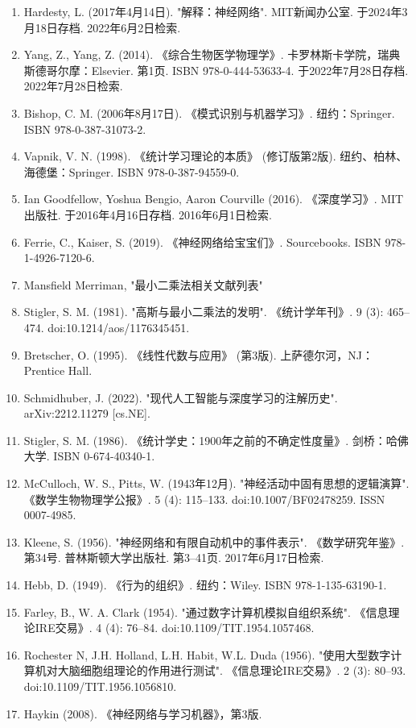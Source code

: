 \begin{enumerate}
\item Hardesty, L. (2017年4月14日). "解释：神经网络". MIT新闻办公室. 于2024年3月18日存档. 2022年6月2日检索.
\item Yang, Z., Yang, Z. (2014). 《综合生物医学物理学》. 卡罗林斯卡学院，瑞典斯德哥尔摩：Elsevier. 第1页. ISBN 978-0-444-53633-4. 于2022年7月28日存档. 2022年7月28日检索.
\item Bishop, C. M. (2006年8月17日). 《模式识别与机器学习》. 纽约：Springer. ISBN 978-0-387-31073-2.
\item Vapnik, V. N. (1998). 《统计学习理论的本质》 (修订版第2版). 纽约、柏林、海德堡：Springer. ISBN 978-0-387-94559-0.
\item Ian Goodfellow, Yoshua Bengio, Aaron Courville (2016). 《深度学习》. MIT出版社. 于2016年4月16日存档. 2016年6月1日检索.
\item Ferrie, C., Kaiser, S. (2019). 《神经网络给宝宝们》. Sourcebooks. ISBN 978-1-4926-7120-6.
\item Mansfield Merriman, "最小二乘法相关文献列表"
\item Stigler, S. M. (1981). "高斯与最小二乘法的发明". 《统计学年刊》. 9 (3): 465–474. doi:10.1214/aos/1176345451.
\item Bretscher, O. (1995). 《线性代数与应用》 (第3版). 上萨德尔河，NJ：Prentice Hall.
\item Schmidhuber, J. (2022). "现代人工智能与深度学习的注解历史". arXiv:2212.11279 [cs.NE].
\item Stigler, S. M. (1986). 《统计学史：1900年之前的不确定性度量》. 剑桥：哈佛大学. ISBN 0-674-40340-1.
\item McCulloch, W. S., Pitts, W. (1943年12月). "神经活动中固有思想的逻辑演算". 《数学生物物理学公报》. 5 (4): 115–133. doi:10.1007/BF02478259. ISSN 0007-4985.
\item Kleene, S. (1956). "神经网络和有限自动机中的事件表示". 《数学研究年鉴》. 第34号. 普林斯顿大学出版社. 第3–41页. 2017年6月17日检索.
\item Hebb, D. (1949). 《行为的组织》. 纽约：Wiley. ISBN 978-1-135-63190-1.
\item Farley, B., W. A. Clark (1954). "通过数字计算机模拟自组织系统". 《信息理论IRE交易》. 4 (4): 76–84. doi:10.1109/TIT.1954.1057468.
\item Rochester N, J.H. Holland, L.H. Habit, W.L. Duda (1956). "使用大型数字计算机对大脑细胞组理论的作用进行测试". 《信息理论IRE交易》. 2 (3): 80–93. doi:10.1109/TIT.1956.1056810.
\item Haykin (2008). 《神经网络与学习机器》，第3版.

\end{enumerate}
